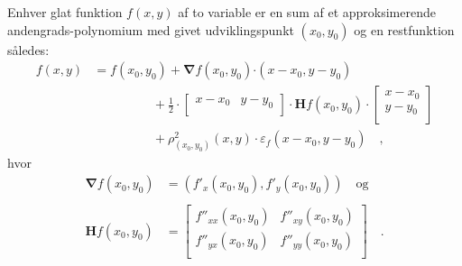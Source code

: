 \begin{theorem}
Enhver glat funktion $f(x,y)$ af to variable er en sum af et approksimerende andengrads-polynomium med givet udviklingspunkt $(x_{0}, y_{0})$ og en restfunktion således:
\begin{equation} \label{eqTaylorLimitGeo}
\begin{aligned}
f(x,y) &= f(x_{0}, y_{0}) + \bm{\nabla}f(x_{0}, y_{0}) \bm{\cdot} (x-x_{0}, y-y_{0}) \\
&\phantom{abcdefghij}+ \frac{1}{2}\cdot \left[
                                          \begin{array}{cc}
                                            x-x_{0} & y-y_{0} \\
                                          \end{array}
                                        \right] \cdot \bm{H}f(x_{0}, y_{0})\cdot \left[
                                                                                   \begin{array}{c}
                                                                                         x-x_{0}  \\
                                                                                         y-y_{0}  \\
                                                                                   \end{array}
                                                                                 \right]\\
&\phantom{abcdefghij}+\rho^{2}_{(x_{0}, y_{0})}(x,y)\cdot \varepsilon_{f}(x-x_{0}, y-y_{0}) \quad ,
\end{aligned}
\end{equation}
hvor
\begin{equation}
\begin{aligned}
\bm{\nabla}f(x_{0}, y_{0}) &= (f'_{x}(x_{0}, y_{0}), f'_{y}(x_{0}, y_{0}))  \quad  \textrm{og} \\ \\
\mathbf{H}f(x_{0}, y_{0}) &= \left[
                              \begin{array}{cc}
                                f''_{xx}(x_{0}, y_{0}) & f''_{xy}(x_{0}, y_{0}) \\
                                f''_{yx}(x_{0}, y_{0}) & f''_{yy}(x_{0}, y_{0}) \\
                              \end{array}
                            \right] \quad .
\end{aligned}
\end{equation}
\end{theorem}
